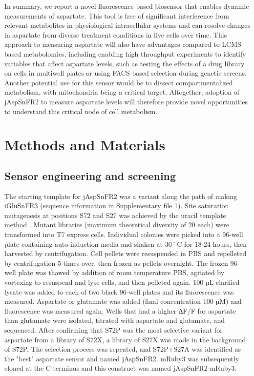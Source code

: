 \documentclass[9pt,lineno]{elife}
\begin{document}
In summary, we report a novel fluorescence based biosensor that enables dynamic measurements of aspartate.
This tool is free of significant interference from relevant metabolites in physiological intracellular systems and can resolve changes in aspartate from diverse treatment conditions in live cells over time.
This approach to measuring aspartate will also have advantages compared to LCMS based metabolomics, including enabling high throughput experiments to identify variables that affect aspartate levels, such as testing the effects of a drug library on cells in multiwell plates or using FACS based selection during genetic screens.
Another potential use for this sensor would be to dissect compartmentalized metabolism, with mitochondria being a critical target.
Altogether, adoption of jAspSnFR2 to measure aspartate levels will therefore provide novel opportunities to understand this critical node of cell metabolism.



\section{Methods and Materials}

\subsection{Sensor engineering and screening}
The starting template for jAspSnFR2 was a variant along the path of making iGluSnFR3 (sequence information in Supplementary file 1).
Site saturation mutagenesis at positions S72 and S27 was achieved by the uracil template method \citep{Kunkel1985-ev}.
Mutant libraries (maximum theoretical diversity of 20 each) were transformed into T7 express cells.
Individual colonies were picked into a 96-well plate containing auto-induction media \citep{Studier2005-ki} and shaken at 30˚C for 18-24 hours, then harvested by centrifugation.
Cell pellets were resuspended in PBS and repelleted by centrifugation 5 times over, then frozen as pellets overnight.
The frozen 96-well plate was thawed by addition of room temperature PBS, agitated by vortexing to resuspend and lyse cells, and then pelleted again.
100 µL clarified lysate was added to each of two black 96-well plates and its fluorescence was measured.
Aspartate or glutamate was added (final concentration 100 µM) and fluorescence was measured again.
Wells that had a higher ∆F/F for aspartate than glutamate were isolated, titrated with aspartate and glutamate, and sequenced.
After confirming that S72P was the most selective variant for aspartate from a library of S72X, a library of S27X was made in the background of S72P.
The selection process was repeated, and S72P+S27A was identified as the "best" aspartate sensor and named jAspSnFR2.
mRuby3 was subsequently cloned at the C-terminus and this construct was named jAspSnFR2-mRuby3.
\end{document}
